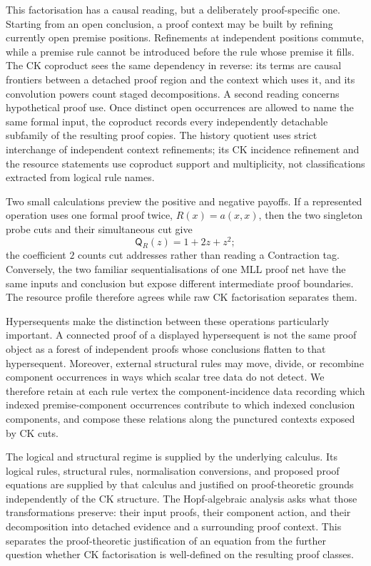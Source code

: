 \documentclass[10pt,a4paper]{article}
\theoremstyle{plain}
\theoremstyle{definition}
\theoremstyle{remark}
\begin{document}
This factorisation has a causal reading, but a deliberately proof-specific
one.  Starting from an open conclusion, a proof context may be built by
refining currently open premise positions.  Refinements at independent
positions commute, while a premise rule cannot be introduced before the rule
whose premise it fills.  The CK coproduct sees the same dependency in reverse:
its terms are causal frontiers between a detached proof region and the context
which uses it, and its convolution powers count staged decompositions.  A
second reading concerns hypothetical proof use.  Once distinct open
occurrences are allowed to name the same formal input, the coproduct records
every independently detachable subfamily of the resulting proof copies.  The
history quotient uses strict interchange of independent context refinements;
its CK incidence refinement and the resource statements use coproduct support
and multiplicity, not classifications extracted from logical rule names.

Two small calculations preview the positive and negative payoffs.  If a
represented operation uses one formal proof twice,
\(R(x)=a(x,x)\), then the two singleton probe cuts and their simultaneous
cut give
\[
                    \mathsf Q_R(z)=1+2z+z^2;
\]
the coefficient \(2\) counts cut addresses rather than reading a
Contraction tag.  Conversely, the two familiar sequentialisations of one
MLL proof net have the same inputs and conclusion but expose different
intermediate proof boundaries.  The resource profile therefore agrees
while raw CK factorisation separates them.

Hypersequents make the distinction between these operations particularly
important.  A connected proof of a displayed hypersequent is not the same
proof object as a forest of independent proofs whose conclusions flatten
to that hypersequent.  Moreover, external structural rules may move, divide,
or recombine component occurrences in ways which scalar tree data do not
detect.  We therefore retain at each rule vertex the component-incidence
data recording which indexed premise-component occurrences contribute to
which indexed conclusion components, and compose these relations along the
punctured contexts exposed by CK cuts.

The logical and structural regime is supplied by the underlying calculus.
Its logical rules, structural rules, normalisation conversions, and proposed
proof equations are supplied by that calculus and justified on
proof-theoretic grounds independently of the CK structure.  The
Hopf-algebraic analysis
asks what those transformations preserve: their input proofs, their
component action, and their decomposition into detached evidence and a
surrounding proof context.  This separates the proof-theoretic justification
of an equation from the further question whether CK factorisation is
well-defined on the resulting proof classes.
\end{document}
